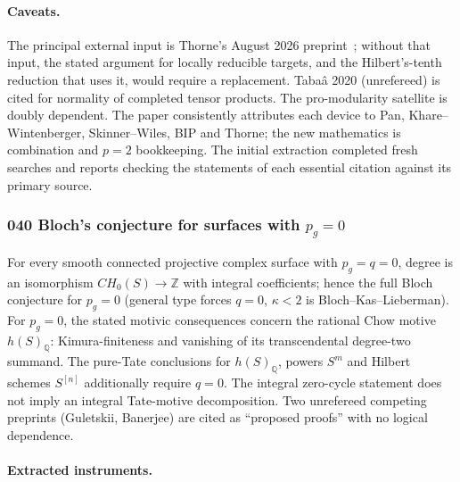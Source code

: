 \documentclass[11pt]{article}
\newcommand{\badges}[1]{\par\noindent{\small\sffamily\color{black!70}#1}\par\smallskip}
\newcommand{\badgesep}{\textbar}
\begin{document}
\paragraph{Caveats.}

The principal external input is Thorne's August 2026 preprint~\cite{src:thorne}; without that input, the stated argument for locally reducible targets, and the Hilbert's-tenth reduction that uses it, would require a replacement. Tabaâ 2020 (unrefereed) is cited for normality of completed tensor products. The pro-modularity satellite is doubly dependent. The paper consistently attributes each device to Pan, Khare--Wintenberger, Skinner--Wiles, BIP and Thorne; the new mathematics is combination and $p=2$ bookkeeping. The initial extraction completed fresh searches and reports checking the statements of each essential citation against its primary source.

\subsubsection{\texorpdfstring{040 \textperiodcentered{} Bloch's conjecture for surfaces with $p_g=0$}{040 · Bloch's conjecture for surfaces with p\_g = 0}}\label{fam:040}
\badges{not formalized \badgesep{} new strategy}

For every smooth connected projective complex surface with $p_g=q=0$, degree is an isomorphism $CH_0(S)\to\mathbb Z$ with integral coefficients; hence the full Bloch conjecture for $p_g=0$ (general type forces $q=0$, $\kappa<2$ is Bloch--Kas--Lieberman). For $p_g=0$, the stated motivic consequences concern the rational Chow motive $h(S)_{\mathbb Q}$: Kimura-finiteness and vanishing of its transcendental degree-two summand. The pure-Tate conclusions for $h(S)_{\mathbb Q}$, powers $S^m$ and Hilbert schemes $S^{[n]}$ additionally require $q=0$. The integral zero-cycle statement does not imply an integral Tate-motive decomposition. Two unrefereed competing preprints (Guletskii, Banerjee) are cited as ``proposed proofs'' with no logical dependence.

\paragraph{Extracted instruments.}
\end{document}
